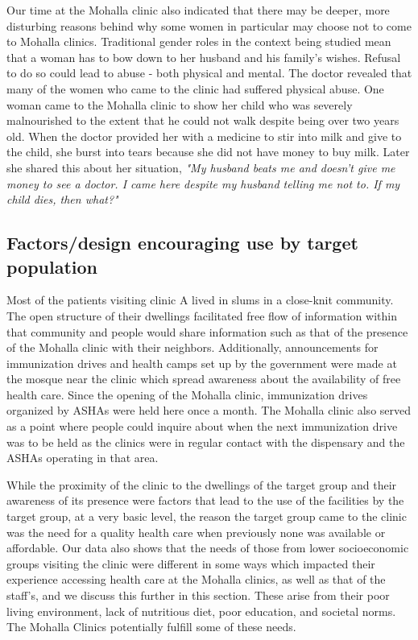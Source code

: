 Our time at the Mohalla clinic also indicated that there may be deeper, more disturbing reasons behind why some women in particular may choose not to come to Mohalla clinics. Traditional gender roles in the context being studied mean that a woman has to bow down to her husband and his family's wishes. Refusal to do so could lead to abuse - both physical and mental. The doctor revealed that many of the women who came to the clinic had suffered physical abuse. One woman came to the Mohalla clinic to show her child who was severely malnourished to the extent that he could not walk despite being over two years old. When the doctor provided her with a medicine to stir into milk and give to the child, she burst into tears because she did not have money to buy milk. Later she shared this about her situation, \textit{"My husband beats me and doesn’t give me money to see a doctor. I came here despite my husband telling me not to. If my child dies, then what?"}

\subsection{Factors/design encouraging use by target population}
Most of the patients visiting clinic A lived in slums in a close-knit community. The open structure of their dwellings facilitated free flow of information within that community and people would share information such as that of the presence of the Mohalla clinic with their neighbors. Additionally, announcements for immunization drives and health camps set up by the government were made at the mosque near the clinic which spread awareness about the availability of free health care. Since the opening of the Mohalla clinic, immunization drives organized by ASHAs were held here once a month. The Mohalla clinic also served as a point where people could inquire about when the next immunization drive was to be held as the clinics were in regular contact with the dispensary and the ASHAs operating in that area.

While the proximity of the clinic to the dwellings of the target group and their awareness of its presence were factors that lead to the use of the facilities by the target group, at a very basic level, the reason the target group came to the clinic was the need for a quality health care when previously none was available or affordable. Our data also shows that the needs of those from lower socioeconomic groups visiting the clinic were different in some ways which impacted their experience accessing health care at the Mohalla clinics, as well as that of the staff's, and we discuss this further in this section. These arise from their poor living environment, lack of nutritious diet, poor education, and societal norms. The Mohalla Clinics potentially fulfill some of these needs.


